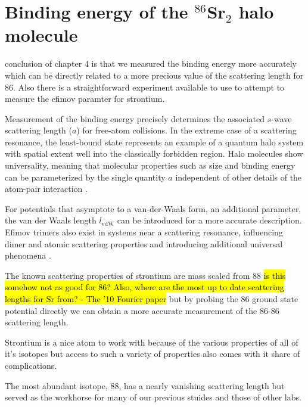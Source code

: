 \chapter{Binding energy of the $^{86}$Sr$_2$ halo molecule} \label{ch:chap5}


conclusion of chapter 4 is that we measured the binding energy more accurately which can be directly related to a more precious value of the scattering length for 86.
Also there is a straightforward experiment available to use to attempt to measure the efimov paramter for strontium.

Measurement of the binding energy precisely determines the associated $s$-wave scattering length ($a$) for free-atom collisions. 
In the extreme case of a scattering resonance, the least-bound state represents an example of a quantum halo system \cite{jrf04} with spatial extent well into the classically forbidden region. 
Halo molecules show universality, meaning that molecular properties such as size and binding energy can be parameterized by the single quantity $a$ independent of other details of the atom-pair interaction \cite{kgj06,bha06}. 

For potentials that asymptote to a van-der-Waals form, an additional parameter, the van der Waals length $l_{\mathrm{vdW}}$ can be introduced for a more accurate description. 
Efimov trimers also exist in systems near a scattering resonance, influencing dimer and atomic scattering properties and introducing additional universal phenomena \cite{bha07,nen17}.

The known scattering properties of strontium are mass scaled from 88 \hl{is this somehow not as good for 86? Also, where are the most up to date scattering lengths for Sr from? - The '10 Fourier paper} but by probing the 86 ground state potential directly we can obtain a more accurate measurement of the 86-86 scattering length.


Strontium is a nice atom to work with because of the various properties of all of it's isotopes but access to such a variety of properties also comes with it share of complications.

The most abundant isotope, 88, has a nearly vanishing scattering length but served as the workhorse for many of our previous stuides and those of other labs.

